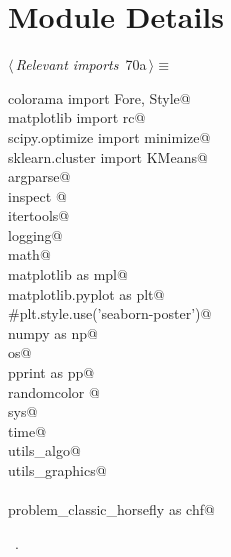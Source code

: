 \documentclass[11.5pt]{report}
\begin{document}
\section{Module Details}
\newchunk 
\begin{flushleft} \small
\begin{minipage}{\linewidth}\label{scrap100}\raggedright\small
{} $\langle\,${\itshape Relevant imports}\nobreak\ {\footnotesize {70a}}$\,\rangle\equiv$
\vspace{-1ex}
\begin{list}{}{} \item
\mbox{}\verb@from colorama import Fore, Style@\\
\mbox{}\verb@from matplotlib import rc@\\
\mbox{}\verb@from scipy.optimize import minimize@\\
\mbox{}\verb@from sklearn.cluster import KMeans@\\
\mbox{}\verb@import argparse@\\
\mbox{}\verb@import inspect @\\
\mbox{}\verb@import itertools@\\
\mbox{}\verb@import logging@\\
\mbox{}\verb@import math@\\
\mbox{}\verb@import matplotlib as mpl@\\
\mbox{}\verb@import matplotlib.pyplot as plt@\\
\mbox{}\verb@#plt.style.use('seaborn-poster')@\\
\mbox{}\verb@import numpy as np@\\
\mbox{}\verb@import os@\\
\mbox{}\verb@import pprint as pp@\\
\mbox{}\verb@import randomcolor @\\
\mbox{}\verb@import sys@\\
\mbox{}\verb@import time@\\
\mbox{}\verb@import utils_algo@\\
\mbox{}\verb@import utils_graphics@\\
\mbox{}\verb@@\\
\mbox{}\verb@import problem_classic_horsefly as chf@\\
\mbox{}\verb@@{\NWsep}
\end{list}
\vspace{-1.5ex}
\footnotesize
\begin{list}{}{\setlength{\itemsep}{-\parsep}\setlength{\itemindent}{-\leftmargin}}
\item \NWtxtMacroRefIn\ .

\item{}
\end{list}
\end{minipage}\vspace{4ex}
\end{flushleft}
\end{document}
